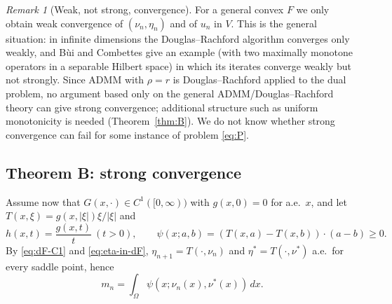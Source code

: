 \documentclass[11pt]{amsart}
\theoremstyle{definition}
\theoremstyle{remark}
\newtheorem{remark}[theorem]{Remark}
\numberwithin{equation}{section}
\newcommand{\dx}{\,dx}
\newcommand{\abs}[1]{\lvert #1\rvert}
\begin{document}
\begin{remark}[Weak, not strong, convergence]\label{rem:weak-only}
For a general convex $F$ we only obtain weak convergence of $(\nu_n,\eta_n)$ and of $u_n$ in $V$. This is the general situation: in infinite dimensions the Douglas--Rachford algorithm converges only weakly, and B\`ui and Combettes \cite{BuiCombettes2020} give an example (with two maximally monotone operators in a separable Hilbert space) in which its iterates converge weakly but not strongly. Since ADMM with $\rho=r$ is Douglas--Rachford applied to the dual problem, no argument based only on the general ADMM/Douglas--Rachford theory can give strong convergence; additional structure such as uniform monotonicity is needed (Theorem~\ref{thm:B}). We do not know whether strong convergence can fail for some instance of problem \eqref{eq:P}.
\end{remark}

\subsection{Theorem B: strong convergence}\label{ssec:thmB}
Assume now that $G(x,\cdot)\in C^1([0,\infty))$ with $g(x,0)=0$ for a.e.\ $x$, and let $T(x,\xi)=g(x,\abs\xi)\xi/\abs\xi$ and
\[
h(x,t)=\frac{g(x,t)}t\ (t>0),\qquad \psi(x;a,b)=(T(x,a)-T(x,b))\cdot(a-b)\ge0 .
\]
By \eqref{eq:dF-C1} and \eqref{eq:eta-in-dF}, $\eta_{n+1}=T(\cdot,\nu_n)$ and $\eta^*=T(\cdot,\nu^*)$ a.e.\ for every saddle point, hence
\begin{equation}\label{eq:mn-psi}
m_n=\int_\Omega\psi(x;\nu_n(x),\nu^*(x))\dx .
\end{equation}
\end{document}

